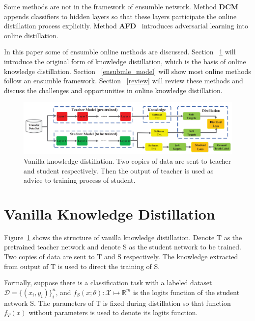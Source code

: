 \documentclass[10pt,twocolumn,letterpaper]{article}
\begin{document}
Some methods are not in the framework of ensumble network.
Method \textbf{DCM}~\cite{yao2020knowledge} appends classifiers to hidden layers so that these layers participate the online distillation process explicitly.
Method \textbf{AFD}~\cite{chung2020feature} introduces adversarial learning into online distillation.

In this paper some of ensumble online methods are discussed.
Section ~\ref{vanilla_kd} will introduce the original form of knowledge distillation, which is the basis of online knowledge distillation.
Section ~\ref{ensubmle_model} will show most online methods follow
an ensumble framework.
Section ~\ref{review} will review these methods and discuss the challenges and opportunities in online knowledge distillation.
\begin{figure}
   \begin{center}
   \includegraphics[width=0.9\linewidth]{vanilla_kd.png}
   \end{center}
      \caption{Vanilla knowledge distillation. Two copies of data are sent to teacher and student respectively. Then the output of teacher
is used as advice to training process of student.}
   \label{fig:vanilla_kd}
\end{figure}
   
\section{Vanilla Knowledge Distillation}\label{vanilla_kd}
Figure~\ref{fig:vanilla_kd} shows the structure of vanilla knowledge distillation. Denote T as the pretrained teacher network and
denote S as the student network to be trained. Two copies of data are sent to T and S respectively.
The knowledge extracted from output of T is used to direct the training of S.

Formally, suppose there is a classification task with a labeled dataset $\mathcal D=\{(x_i, y_i)\}_i^n$, and $f_S(x;\theta):\mathcal X\mapsto\mathbb{R}^m$ is the logits function of the student network S. The parameters of T is fixed
during distillation so that function $f_T(x)$ without parameters is used to denote its logits function.
\end{document}
